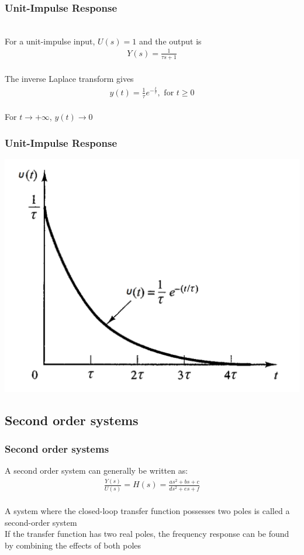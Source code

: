 \begin{frame}
\frametitle{Unit-Impulse Response}

\\ For a unit-impulse input, $U(s)=1$ and the output is
\vspace{0.2cm}
\\ 
\begin{align*}
Y(s)=\frac{1}{\tau s +1}
\end{align*}
\vspace{0.2cm}
\pause
\\ The inverse Laplace transform gives
\vspace{0.2cm}
\\
\begin{align*}
y(t)= \frac{1}{\tau}e^{-\frac{t}{\tau}} ,\text{ for } t \ge 0
\end{align*}
\vspace{0.2cm}
\pause
\\ For $t\rightarrow +\infty$, $y(t)\rightarrow 0$
\end{frame}

\begin{frame}
\frametitle{Unit-Impulse Response}
\includegraphics[width=0.8\linewidth]{Afbeelding5}
\end{frame}

\subsection{Second order systems} 

\begin{frame}
\frametitle{Second order systems}
A second order system can generally be written as:
\vspace{0.4cm}
\\ 
\begin{align*}
\frac{Y(s)}{U(s)}=H(s)=\frac{as^2+ bs+ c}{ds^2+ es+ f}
\end{align*}
\vspace{0.2cm}
\pause
\\ A system where the closed-loop transfer function possesses two poles is called a second-order system
\vspace{0.4cm}
\pause
\\ If the transfer function has two real poles, the frequency response can be found by combining the effects of both poles
\end{frame}

